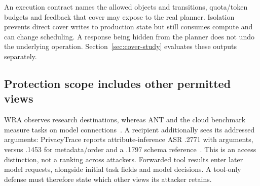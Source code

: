 An execution contract names the allowed objects and transitions, quota/token budgets and feedback that cover may expose to the real planner. Isolation prevents direct cover writes to production state but still consumes compute and can change scheduling. A response being hidden from the planner does not undo the underlying operation. Section~\ref{sec:cover-study} evaluates these outputs separately.

\subsection{Protection scope includes other permitted views}\label{sec:crosslink}
WRA observes research destinations, whereas ANT and the cloud benchmark measure tasks on model connections~\cite{jeong2026wra,li2026ant,pouryousef2026traffic}. A recipient additionally sees its addressed arguments: PrivacyTrace reports attribute-inference ASR .2771 with arguments, versus .1453 for metadata/order and a .1797 schema reference~\cite{duan2026privacytrace}. This is an access distinction, not a ranking across attackers. Forwarded tool results enter later model requests, alongside initial task fields and model decisions. A tool-only defense must therefore state which other views its attacker retains.
